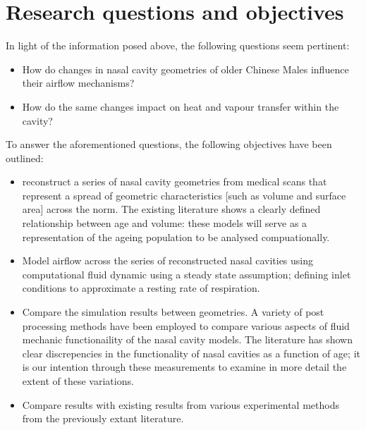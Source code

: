 \section{Research questions and objectives}

In light of the information posed above, the following questions seem pertinent:

\begin{itemize}

  \item How do changes in nasal cavity geometries of older Chinese Males influence their airflow mechanisms?

  \item How do the same changes impact on heat and vapour transfer within the cavity?

\end{itemize}

To answer the aforementioned questions, the following objectives have been outlined:

\begin{itemize}

  \item reconstruct a series of nasal cavity geometries from medical scans that represent a spread of geometric characteristics [such as volume and surface area] across the norm. The existing literature shows a clearly defined relationship between age and volume: these models will serve as a representation of the ageing population to be analysed compuationally.

  \item Model airflow across the series of reconstructed nasal cavities using computational fluid dynamic using a steady state assumption; defining inlet conditions to approximate a resting rate of respiration. 

  \item Compare the simulation results between geometries. A variety of post processing methods have been employed to compare various aspects of fluid mechanic functionaility of the nasal cavity models. The literature has shown clear discrepencies in the functionality of nasal cavities as a function of age; it is our intention through these measurements to examine in more detail the extent of these variations.

  \item  Compare results with existing results from various experimental methods from the previously extant literature.
\end{itemize}
 
